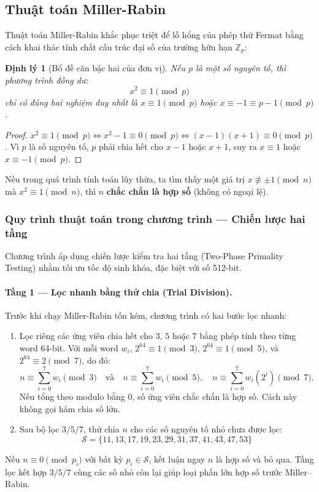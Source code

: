 \documentclass[12pt,a4paper]{article}
\theoremstyle{plain}
\newtheorem{theorem}{Định lý}
\begin{document}
\subsection{Thuật toán Miller-Rabin}
Thuật toán Miller-Rabin khắc phục triệt để lỗ hổng của phép thử Fermat bằng cách khai thác tính chất cấu trúc đại số của trường hữu hạn $\mathbb{Z}_p$:

\begin{theorem}[Bổ đề căn bậc hai của đơn vị]
Nếu $p$ là một số nguyên tố, thì phương trình đồng dư:
\begin{equation}
x^2 \equiv 1 \pmod p
\end{equation}
chỉ có đúng hai nghiệm duy nhất là $x \equiv 1 \pmod p$ hoặc $x \equiv -1 \equiv p - 1 \pmod p$.
\end{theorem}

\begin{proof}
$x^2 \equiv 1 \pmod p \iff x^2 - 1 \equiv 0 \pmod p \iff (x - 1)(x + 1) \equiv 0 \pmod p$. Vì $p$ là số nguyên tố, $p$ phải chia hết cho $x - 1$ hoặc $x + 1$, suy ra $x \equiv 1$ hoặc $x \equiv -1 \pmod p$.
\end{proof}

Nếu trong quá trình tính toán lũy thừa, ta tìm thấy một giá trị $x \not\equiv \pm 1 \pmod n$ mà $x^2 \equiv 1 \pmod n$, thì $n$ \textbf{chắc chắn là hợp số} (không có ngoại lệ).

\subsubsection{Quy trình thuật toán trong chương trình — Chiến lược hai tầng}
Chương trình áp dụng chiến lược kiểm tra hai tầng (Two-Phase Primality Testing) nhằm tối ưu tốc độ sinh khóa, đặc biệt với số 512-bit.

\paragraph{Tầng 1 — Lọc nhanh bằng thử chia (Trial Division).}
Trước khi chạy Miller-Rabin tốn kém, chương trình có hai bước lọc nhanh:
\begin{enumerate}
    \item Lọc riêng các ứng viên chia hết cho $3$, $5$ hoặc $7$ bằng phép tính theo từng word 64-bit. Với mỗi word $w_i$, $2^{64} \equiv 1 \pmod 3$, $2^{64} \equiv 1 \pmod 5$, và $2^{64} \equiv 2 \pmod 7$, do đó:
    \[
    n \equiv \sum_{i=0}^{7} w_i \pmod 3
    \quad\text{và}\quad
    n \equiv \sum_{i=0}^{7} w_i \pmod 5,
    \quad
    n \equiv \sum_{i=0}^{7} w_i(2^i)\pmod 7.
    \]
    Nếu tổng theo modulo bằng $0$, số ứng viên chắc chắn là hợp số. Cách này không gọi hàm chia số lớn.
    \item Sau bộ lọc $3/5/7$, thử chia $n$ cho các số nguyên tố nhỏ chưa được lọc:
\begin{equation}
\mathcal{S} = \{11, 13, 17, 19, 23, 29, 31, 37, 41, 43, 47, 53\}
\end{equation}
\end{enumerate}
Nếu $n \equiv 0 \pmod{p_i}$ với bất kỳ $p_i \in \mathcal{S}$, kết luận ngay $n$ là hợp số và bỏ qua. Tầng lọc kết hợp $3/5/7$ cùng các số nhỏ còn lại giúp loại phần lớn hợp số trước Miller--Rabin.
\end{document}

